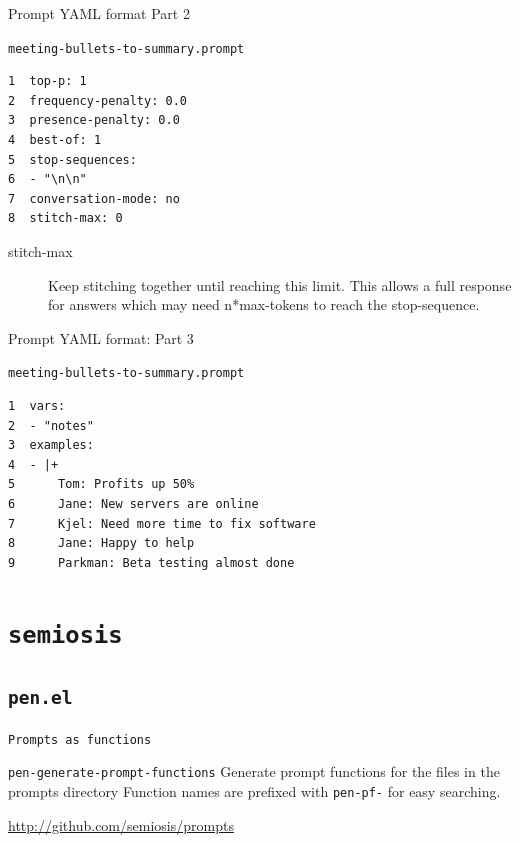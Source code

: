 \documentclass[presentation]{beamer}
\begin{document}
\begin{frame}[label={sec:org87e4882},fragile]{Prompt YAML format Part 2}
 \begin{block}{\texttt{meeting-bullets-to-summary.prompt}}
\begin{verbatim}
1  top-p: 1
2  frequency-penalty: 0.0
3  presence-penalty: 0.0
4  best-of: 1
5  stop-sequences:
6  - "\n\n"
7  conversation-mode: no
8  stitch-max: 0
\end{verbatim}

\begin{description}
\item[{stitch-max}] Keep stitching together until reaching this limit.
This allows a full response for answers which may need n*max-tokens to reach the stop-sequence.
\end{description}
\end{block}
\end{frame}

\begin{frame}[label={sec:org78c2f6c},fragile]{Prompt YAML format: Part 3}
 \begin{block}{\texttt{meeting-bullets-to-summary.prompt}}
\begin{verbatim}
1  vars:
2  - "notes"
3  examples:
4  - |+
5      Tom: Profits up 50%
6      Jane: New servers are online
7      Kjel: Need more time to fix software
8      Jane: Happy to help
9      Parkman: Beta testing almost done
\end{verbatim}
\end{block}
\end{frame}

\section{\texttt{semiosis}}
\label{sec:orgc90e671}
\subsection{\texttt{pen.el}}
\label{sec:org46a1267}
\begin{frame}[label={sec:org27f0990},fragile]{\texttt{Prompts as functions}}
 \begin{block}{\texttt{pen-generate-prompt-functions}}
Generate prompt functions for the files in the
prompts directory Function names are prefixed
with \texttt{pen-pf-} for easy searching.

\url{http://github.com/semiosis/prompts}
\end{block}
\end{frame}
\end{document}

